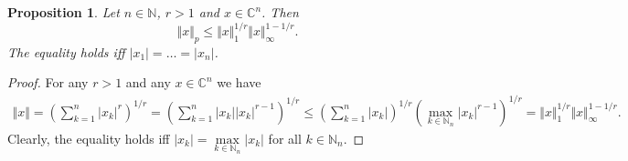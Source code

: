 \documentclass[12pt]{article}
\newtheorem{proposition}[theorem]{Proposition}
\begin{document}
\begin{proposition}\label{SpclLyapIneq}
    Let $n\in\mathbb{N}$, $r>1$ and $x\in\mathbb{C}^n$. Then
    \[
        \Vert x\Vert_p\leq \Vert x\Vert_1^{1/r}\Vert x\Vert_\infty^{1-1/r}.
    \]
    The equality holds iff $|x_1|=\ldots=|x_n|$.
\end{proposition}
\begin{proof}
    For any $r>1$ and any $x\in\mathbb{C}^n$ we have
    \[
    \begin{aligned}
        \Vert x\Vert
        =\left(\sum_{k=1}^n |x_k|^r \right)^{1/r}
        =\left(\sum_{k=1}^n |x_k| |x_k|^{r-1} \right)^{1/r}
        \leq\left(\sum_{k=1}^n |x_k| \right)^{1/r} 
        \left(\max\limits_{k\in\mathbb{N}_n}|x_k|^{r-1}\right)^{1/r}
        =\Vert x\Vert_1^{1/r}\Vert x\Vert_\infty^{1-1/r}.
    \end{aligned}
    \]
    Clearly, the equality holds iff $|x_k|=\max\limits_{k\in\mathbb{N}_n}|x_k|$
    for all $k\in\mathbb{N}_n$.
\end{proof}
\end{document}
